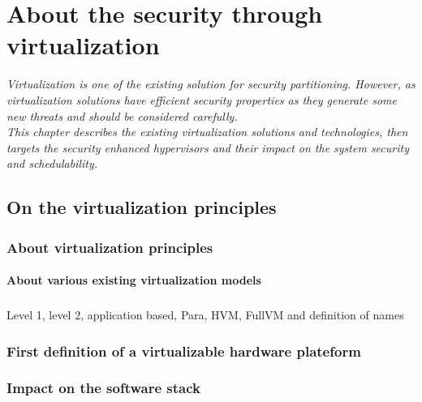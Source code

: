 ﻿%

\chapter{About the security through virtualization}

{\it
Virtualization is one of the existing solution for security partitioning. However, as
virtualization solutions have efficient security properties as they generate some new threats and
should be considered carefully.\\
This chapter describes the existing virtualization solutions and technologies, then targets the security enhanced
hypervisors and their impact on the system security and schedulability.
}

\doMinitoc

\section{On the virtualization principles}

\subsection{About virtualization principles}

\subsubsection{About various existing virtualization models}

\paragraph{}
Level 1, level 2, application based, Para, HVM, FullVM and definition of names

\subsection{First definition of a virtualizable hardware plateform}

\subsection{Impact on the software stack}

